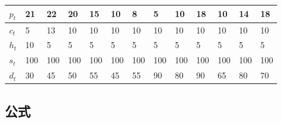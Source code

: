 	\begin{table}[!ht]
		\begin{tabular*}{\hsize}{@{}@{\extracolsep{\fill}}lllllllllllll@{}}
			\toprule
			$p_{t}$  &21  &22  &20  &15  &10  &8   &5   &10  &18  &10  &14  &18\\
			\midrule
			$c_{t}$  &5   &13  &10  &10  &10  &10  &10  &10  &10  &10  &10  &10\\
			$h_{t}$  &10  &5   &5   &5   &5   &5   &5   &5   &5   &5   &5   &5 \\
			$s_{t}$  &100 &100 &100 &100 &100 &100 &100 &100 &100 &100 &100 &100\\
			$d_{t}$  &30  &45  &50  &55  &45  &55  &90  &80  &90  &65  &80  &70 \\
			\bottomrule
		\end{tabular*}
		\label{tab:lable} %
	\end{table}
	
	\subsection{公式}
	 